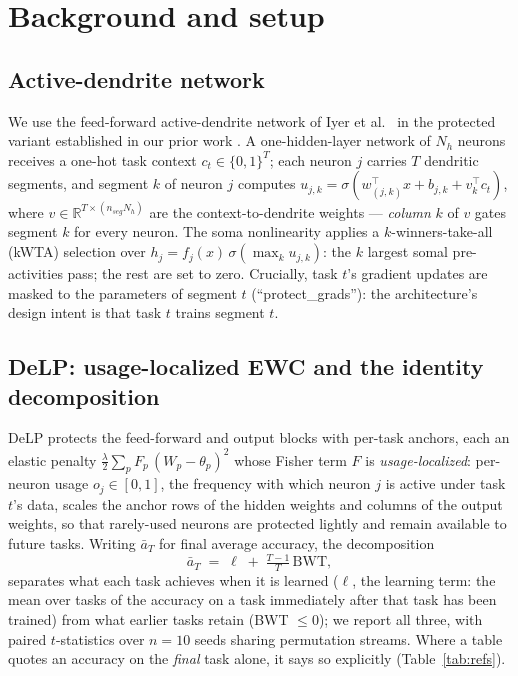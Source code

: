 \documentclass[10pt]{article}
\newcommand{\delp}{DeLP}
\begin{document}
\section{Background and setup}
\label{sec:setup}

\subsection{Active-dendrite network}
\label{sec:adnet}

\label{sec:adnet}

We use the feed-forward active-dendrite network of Iyer et al.\
\citep{iyer2022} in the protected variant established in our prior work
\citep{zhou2026delp}. A one-hidden-layer network of $N_h$ neurons receives a
one-hot task context $c_t \in \{0,1\}^{T}$; each neuron $j$ carries $T$
dendritic segments, and segment $k$ of neuron $j$ computes
$u_{j,k} = \sigma(w_{(j,k)}^\top x + b_{j,k} + v_{k}^\top c_t)$, where
$v \in \mathbb{R}^{T \times (n_{seg} N_h)}$ are the context-to-dendrite
weights --- \emph{column} $k$ of $v$ gates segment $k$ for every neuron.
The soma nonlinearity applies a $k$-winners-take-all (kWTA) selection over
$h_j = f_j(x)\, \sigma(\max_k u_{j,k})$: the $k$ largest somal pre-activities
pass; the rest are set to zero. Crucially, task $t$'s gradient updates are
masked to the parameters of segment $t$ (``protect\_grads''): the
architecture's design intent is that task $t$ trains segment $t$.

\subsection{\delp{}: usage-localized EWC and the identity decomposition}
\label{sec:delp}

\label{sec:delp}

\delp{} \citep{zhou2026delp} protects the feed-forward and output blocks with
per-task anchors, each an elastic penalty
$\frac{\lambda}{2}\sum_p F_p\, (W_p - \theta_p)^2$ whose Fisher term $F$ is
\emph{usage-localized}: per-neuron usage $o_j \in [0,1]$, the frequency with
which neuron $j$ is active under task $t$'s data, scales the anchor rows of
the hidden weights and columns of the output weights, so that rarely-used
neurons are protected lightly and remain available to future tasks. Writing
$\bar a_T$ for final average accuracy, the decomposition
\begin{equation}
\bar a_T \;=\; \ell \;+\; \tfrac{T-1}{T}\,\mathrm{BWT},
\label{eq:identity}
\end{equation}
separates what each task achieves when it is learned ($\ell$, the learning
term: the mean over tasks of the accuracy on a task immediately after that
task has been trained) from what earlier tasks retain (BWT $\le 0$); we
report all three, with paired $t$-statistics over $n{=}10$ seeds sharing
permutation streams. Where a table quotes an accuracy on the \emph{final}
task alone, it says so explicitly (Table~\ref{tab:refs}).
\end{document}
